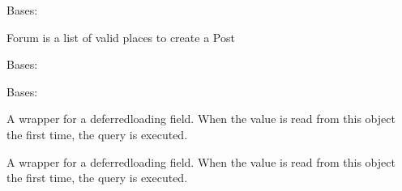 \documentclass[letterpaper,10pt,english]{sphinxmanual}
\begin{document}
\begin{fulllineitems}
\label{\detokenize{forums:forums.models.Forum}}
Bases: 

Forum is a list of valid places to create a Post

\begin{fulllineitems}
\label{\detokenize{forums:forums.models.Forum.DoesNotExist}}
Bases: 

\end{fulllineitems}


\begin{fulllineitems}
\label{\detokenize{forums:forums.models.Forum.MultipleObjectsReturned}}
Bases: 

\end{fulllineitems}


\begin{fulllineitems}
\label{\detokenize{forums:forums.models.Forum.bg_colour}}
A wrapper for a deferred\sphinxhyphen{}loading field. When the value is read from this
object the first time, the query is executed.

\end{fulllineitems}


\begin{fulllineitems}
\label{\detokenize{forums:forums.models.Forum.description}}
A wrapper for a deferred\sphinxhyphen{}loading field. When the value is read from this
object the first time, the query is executed.


\end{fulllineitems}
\end{fulllineitems}
\end{document}
